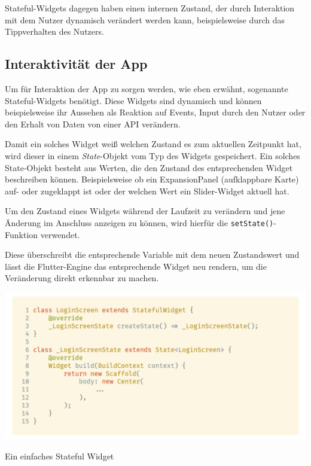 Stateful-Widgets dagegen haben einen internen Zustand, der durch Interaktion mit dem Nutzer dynamisch verändert
werden kann, beispielsweise durch das Tippverhalten des Nutzers.

\subsection{Interaktivität der App}


Um für Interaktion der App zu sorgen werden, wie eben erwähnt, sogenannte Stateful-Widgets benötigt. Diese Widgets sind dynamisch und können beispielsweise ihr Aussehen als Reaktion auf Events, Input durch den Nutzer oder den Erhalt von Daten von einer API verändern.

Damit ein solches Widget weiß welchen Zustand es zum aktuellen Zeitpunkt hat, wird dieser in einem \textit{State}-Objekt vom Typ
des Widgets gespeichert. Ein solches State-Objekt besteht aus Werten, die den Zustand des entsprechenden Widget beschreiben können. Beispielsweise ob ein ExpansionPanel (aufklappbare Karte) auf- oder zugeklappt ist oder der welchen Wert ein Slider-Widget aktuell hat.

Um den Zustand eines Widgets während der Laufzeit zu verändern und jene Änderung im Anschluss anzeigen zu können, wird hierfür die \lstinline{setState()}-Funktion verwendet.

Diese überschreibt die entsprechende Variable mit dem neuen Zustandswert und lässt die Flutter-Engine das entsprechende
Widget neu rendern, um die Veränderung direkt erkennbar zu machen.

\begin{code}
    \centering
    \includegraphics[width=1\textwidth]{images/Flutter/flutterStatefulWidget.png}
    \vspace{-25pt}
    \caption{Ein einfaches Stateful Widget}
\end{code}

